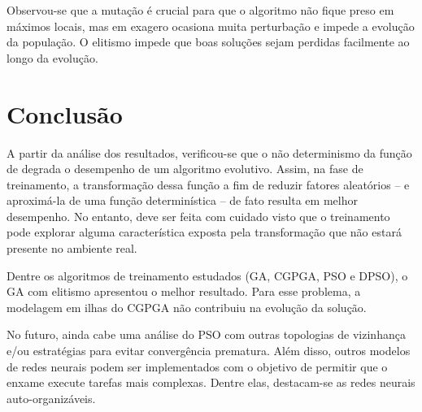 Observou-se que a mutação é crucial para que o algoritmo não fique preso em máximos locais, mas em exagero ocasiona muita perturbação e impede a evolução da população. O elitismo impede que boas soluções sejam perdidas facilmente ao longo da evolução.

\section{Conclusão}
\label{sec:conclusion}

A partir da análise dos resultados, verificou-se que o não determinismo da função de \fitness degrada o desempenho de um algoritmo evolutivo. Assim, na fase de treinamento, a transformação dessa função a fim de reduzir fatores aleatórios -- e aproximá-la de uma função determinística -- de fato resulta em melhor desempenho. No entanto, deve ser feita com cuidado visto que o treinamento pode explorar alguma característica exposta pela transformação que não estará presente no ambiente real.

Dentre os algoritmos de treinamento estudados (GA, CGPGA, PSO e DPSO), o GA com elitismo apresentou o melhor resultado. Para esse problema, a modelagem em ilhas do CGPGA não contribuiu na evolução da solução.

No futuro, ainda cabe uma análise do PSO com outras topologias de vizinhança e/ou estratégias para evitar convergência prematura. Além disso, outros modelos de redes neurais podem ser implementados com o objetivo de permitir que o enxame execute tarefas mais complexas. Dentre elas, destacam-se as redes neurais auto-organizáveis.